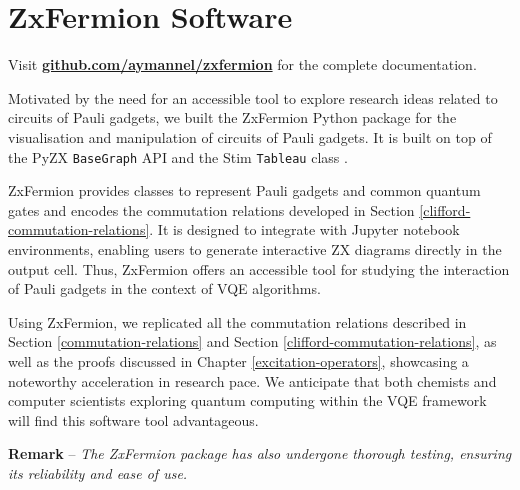 \chapter{ZxFermion Software}%
\label{zxfermion}

Visit \textbf{\href{https://github.com/aymannel/zxfermion}{github.com/aymannel/zxfermion} }for the complete documentation.

Motivated by the need for an accessible tool to explore research ideas related to circuits of Pauli gadgets, we built the ZxFermion Python package for the visualisation and manipulation of circuits of Pauli gadgets. It is built on top of the PyZX \lstinline{BaseGraph} API \cite{Kissinger2020} and the Stim \lstinline{Tableau} class \cite{Gidney2021}.

ZxFermion provides classes to represent Pauli gadgets and common quantum gates and encodes the commutation relations developed in Section \ref{clifford-commutation-relations}. It is designed to integrate with Jupyter notebook environments, enabling users to generate interactive ZX diagrams directly in the output cell. Thus, ZxFermion offers an accessible tool for studying the interaction of Pauli gadgets in the context of VQE algorithms.

Using ZxFermion, we replicated all the commutation relations described in Section \ref{commutation-relations} and Section \ref{clifford-commutation-relations}, as well as the proofs discussed in Chapter \ref{excitation-operators}, showcasing a noteworthy acceleration in research pace. We anticipate that both chemists and computer scientists exploring quantum computing within the VQE framework will find this software tool advantageous.

\hangindent=10pt 
\textbf{Remark} -- \textit{The ZxFermion package has also undergone thorough testing, ensuring its reliability and ease of use.}

